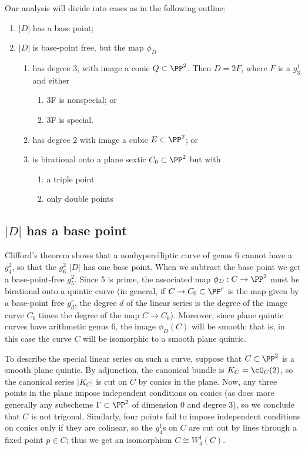 
Our analysis will divide into cases as in the following outline:
\begin{enumerate}
 \item $|D|$ has a base point;
 \item $|D|$ is base-point free, but the map $\phi_{D}$
 
\begin{enumerate}
\item has degree 3, with image a conic $Q \subset \PP^2$. Then $D= 2F$, where $F$ is a $g^{1}_{3}$ and either
\begin{enumerate}
 \item 3F is nonspecial; or
 \item 3F is special.
\end{enumerate}
\item has degree 2 with image a cubic  $E \subset \PP^2$; or
\item is birational onto a plane sextic $C_0\subset \PP^2$ but with 
\begin{enumerate}
 \item a triple point
 \item only double points
\end{enumerate}
\end{enumerate}
\end{enumerate}


\subsection{$|D|$ has a base point}\label{g26 has a base point}
Clifford's theorem shows that a nonhyperelliptic curve of genus 6 cannot have a $g^2_4$, so that the $g^2_6$ 
$|D|$ has one base point.
When we subtract the base point we get a base-point-free $g^2_5$. Since 5 is prime, the associated map $\phi_D : C \to \PP^2$ must be birational onto a quintic curve (in general, if $C \to C_0 \subset \PP^r$ is the map given by a base-point free $g^r_d$, the degree $d$ of the linear series is the degree of the image curve $C_0$ times the degree of the map $C \to C_0$). Moreover, since plane quintic curves have arithmetic genus 6, the image $\phi_D(C)$ will be smooth; that is, in this case the curve $C$ will be isomorphic to a smooth plane quintic.

To describe the special linear series on such a curve, suppose that $C \subset \PP^2$ is a smooth plane quintic. By adjunction, the canonical bundle is $K_C = \cO_C(2)$, so the canonical series $|K_C|$ is cut on $C$ by conics in the plane. Now, any three points in the plane impose independent conditions on conics (as does more generally any subscheme $\Gamma \subset \PP^2$ of dimension 0 and degree 3), so we  conclude that $C$ is not trigonal. Similarly, four points fail to impose independent conditions on conics only if they are colinear, so the $g^1_4$s on $C$ are cut out by lines through a fixed point $p \in C$; thus we get an isomorphism $C \cong W^1_4(C)$.

